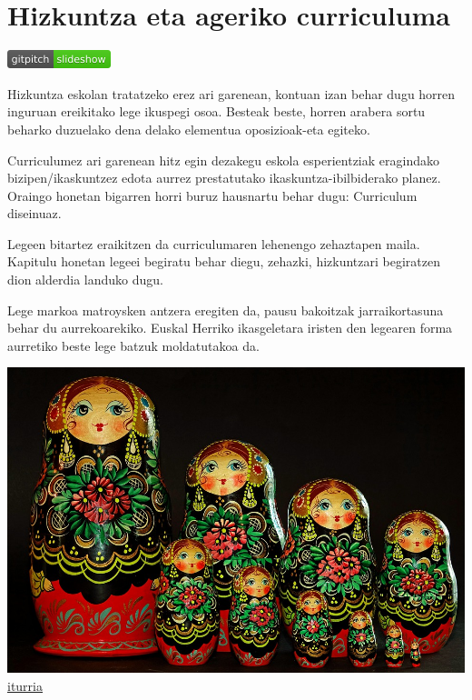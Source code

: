 \documentclass[]{book}
\begin{document}
\hypertarget{hizkuntza-eta-ageriko-curriculuma}{%
\chapter{Hizkuntza eta ageriko curriculuma}\label{hizkuntza-eta-ageriko-curriculuma}}

\href{https://gitpitch.com/JuanAbasolo/HD/02-gaia?grs=github\&t=moon}{\includegraphics{assets/badge.png}}

Hizkuntza eskolan tratatzeko erez ari garenean, kontuan izan behar dugu horren inguruan ereikitako lege ikuspegi osoa. Besteak beste, horren arabera sortu beharko duzuelako dena delako elementua oposizioak-eta egiteko.

Curriculumez ari garenean hitz egin dezakegu eskola esperientziak eragindako bizipen/ikaskuntzez edota aurrez prestatutako ikaskuntza-ibilbiderako planez. Oraingo honetan bigarren horri buruz hausnartu behar dugu: Curriculum diseinuaz.

Legeen bitartez eraikitzen da curriculumaren lehenengo zehaztapen maila. Kapitulu honetan legeei begiratu behar diegu, zehazki, hizkuntzari begiratzen dion alderdia landuko dugu.

Lege markoa matroysken antzera eregiten da, pausu bakoitzak jarraikortasuna behar du aurrekoarekiko. Euskal Herriko ikasgeletara iristen den legearen forma aurretiko beste lege batzuk moldatutakoa da.

\includegraphics{assets/ornament-3131097_960_720.jpg}
\href{https://pixabay.com/en/ornament-matryoshka-babuschka-3131097/}{iturria}
\end{document}
